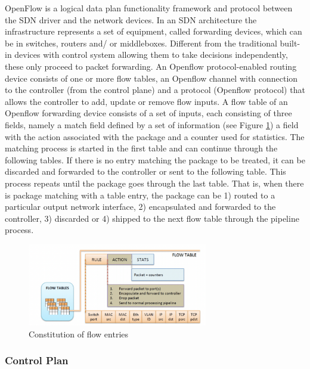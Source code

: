 \documentclass[
  oneside,
  11pt, a4paper,
  footinclude=true,
  headinclude=true,
  cleardoublepage=empty
]{scrbook}
\begin{document}
OpenFlow is a logical data plan functionality framework and protocol between the SDN driver and the network devices.
In an SDN architecture the infrastructure represents a set of equipment, called forwarding devices, which can be in switches, routers and/ or middleboxes. Different from the  traditional built-in devices with control system
allowing them to take decisions independently, these only proceed to packet forwarding. An Openflow protocol-enabled routing device consists of one or more flow tables, an Openflow channel with connection to the controller (from the control plane) and a protocol (Openflow protocol) that allows the controller to add, update or remove flow inputs. A flow table of an Openflow forwarding device consists of a set of inputs, each consisting of three fields, namely a match field defined by a set of information (see Figure \ref{const-flow-entry}) a field with the action associated with the package and a counter used for statistics.
The matching process is started in the first table and can continue through the following tables. If there is no entry matching the package to be treated, it can be discarded and  forwarded to the controller or sent to the following table.
This process repeats until the package goes through the last table.
That is, when there is package matching with a table entry, the package can be 1) routed to a particular output network interface, 2) encapsulated and forwarded to the controller, 3) discarded or 4) shipped to the next flow table through the pipeline process. 

\begin{figure}[H]
\begin{center}
  \includegraphics[width=0.70\textwidth]{img/flow table.png}
\end{center}
  \caption{Constitution of flow entries ~\cite{primeiro}}
  \centering
\label{const-flow-entry}
\end{figure}


\subsubsection{Control Plan}\par
\end{document}
